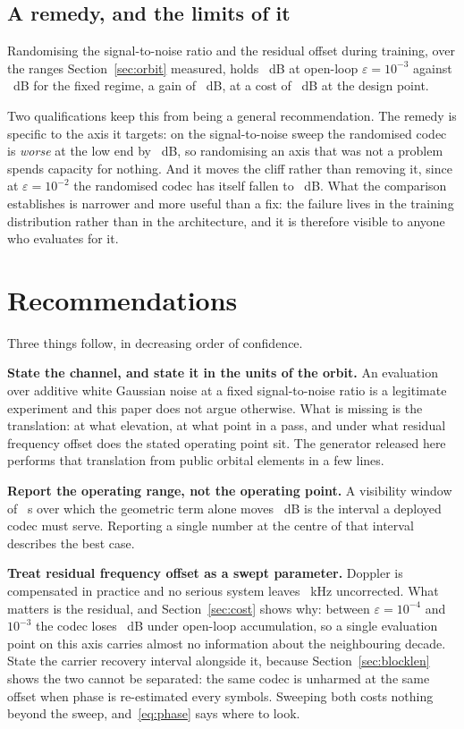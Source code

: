 \documentclass[preprint,11pt,3p]{elsarticle}
\begin{document}
\subsection{A remedy, and the limits of it}

Randomising the signal-to-noise ratio and the residual offset during training, over the ranges
Section~\ref{sec:orbit} measured, holds \numPsnrAugCfoEb~dB at open-loop
$\varepsilon = 10^{-3}$ against \numPsnrCfoEb~dB for the fixed regime, a gain of
\numAugGainCfo~dB, at a cost of \numAugCost~dB at the design point.

Two qualifications keep this from being a general recommendation. The remedy is specific to the
axis it targets: on the signal-to-noise sweep the randomised codec is \emph{worse} at the low end
by \numAugSnrDelta~dB, so randomising an axis that was not a problem spends capacity for nothing.
And it moves the cliff rather than removing it, since at $\varepsilon = 10^{-2}$ the randomised
codec has itself fallen to \numPsnrAugCfoEc~dB. What the comparison establishes is narrower and
more useful than a fix: the failure lives in the training distribution rather than in the
architecture, and it is therefore visible to anyone who evaluates for it.

\section{Recommendations}

Three things follow, in decreasing order of confidence.

\textbf{State the channel, and state it in the units of the orbit.} An evaluation over additive
white Gaussian noise at a fixed signal-to-noise ratio is a legitimate experiment and this paper
does not argue otherwise. What is missing is the translation: at what elevation, at what point in
a pass, and under what residual frequency offset does the stated operating point sit. The
generator released here performs that translation from public orbital elements in a few lines.

\textbf{Report the operating range, not the operating point.} A visibility window of
\numDurMed~s over which the geometric term alone moves \numFsplMed~dB is the interval a deployed
codec must serve. Reporting a single number at the centre of that interval describes the best
case.

\textbf{Treat residual frequency offset as a swept parameter.} Doppler is compensated in practice
and no serious system leaves \numDopKaMed~kHz uncorrected. What matters is the residual, and
Section~\ref{sec:cost} shows why: between $\varepsilon = 10^{-4}$ and $10^{-3}$ the codec loses
\numDropCfoEb~dB under open-loop accumulation, so a single evaluation point on this axis carries
almost no information about the neighbouring decade. State the carrier recovery interval
alongside it, because Section~\ref{sec:blocklen} shows the two cannot be separated: the same
codec is unharmed at the same offset when phase is re-estimated every \numLprac{} symbols.
Sweeping both costs nothing beyond the sweep, and~\eqref{eq:phase} says where to look.
\end{document}
